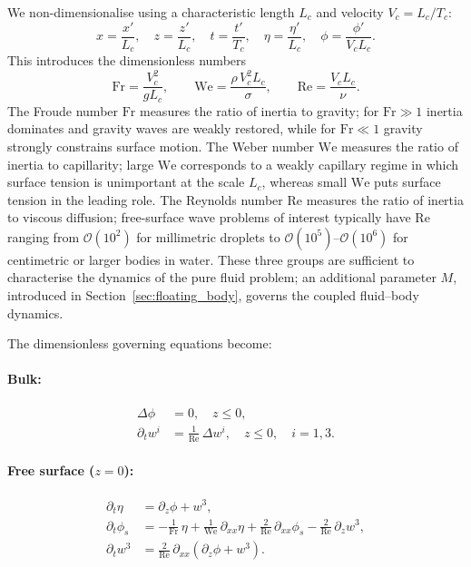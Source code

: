 \documentclass{article}
\newcommand{\Fr}{\mathrm{Fr}}
\newcommand{\We}{\mathrm{We}}
\newcommand{\Rey}{\mathrm{Re}}
\newcommand{\OO}{\mathcal{O}}
\begin{document}
We non-dimensionalise using a characteristic length $L_c$ and velocity $V_c = L_c / T_c$:
\begin{equation}
    x = \frac{x'}{L_c}, \quad z = \frac{z'}{L_c}, \quad t = \frac{t'}{T_c}, \quad \eta = \frac{\eta'}{L_c}, \quad \phi = \frac{\phi'}{V_c L_c}.
    \label{eq:nondim}
\end{equation}
This introduces the dimensionless numbers
\begin{equation}
    \Fr = \frac{V_c^2}{g L_c}, \qquad
    \We = \frac{\rho\, V_c^2 L_c}{\sigma}, \qquad
    \Rey = \frac{V_c L_c}{\nu}.
    \label{eq:dimless}
\end{equation}
The Froude number $\Fr$ measures the ratio of inertia to gravity; for $\Fr \gg 1$ inertia dominates and gravity waves are weakly restored, while for $\Fr \ll 1$ gravity strongly constrains surface motion.
The Weber number $\We$ measures the ratio of inertia to capillarity; large $\We$ corresponds to a weakly capillary regime in which surface tension is unimportant at the scale $L_c$, whereas small $\We$ puts surface tension in the leading role.
The Reynolds number $\Rey$ measures the ratio of inertia to viscous diffusion; free-surface wave problems of interest typically have $\Rey$ ranging from $\OO(10^2)$ for millimetric droplets to $\OO(10^5)$--$\OO(10^6)$ for centimetric or larger bodies in water.
These three groups are sufficient to characterise the dynamics of the pure fluid problem; an additional parameter $M$, introduced in Section~\ref{sec:floating_body}, governs the coupled fluid--body dynamics.

The dimensionless governing equations become:

\paragraph{Bulk:}
\begin{align}
    \Delta\phi &= 0, \quad z \leq 0, \label{eq:nd_laplace} \\
    \partial_t w^i &= \frac{1}{\Rey}\,\Delta w^i, \quad z \leq 0, \quad i = 1,3. \label{eq:nd_heat}
\end{align}

\paragraph{Free surface ($z = 0$):}
\begin{align}
    \partial_t \eta &= \partial_z \phi + w^3, \label{eq:nd_kin} \\
    \partial_t \phi_s &= -\frac{1}{\Fr}\,\eta + \frac{1}{\We}\,\partial_{xx}\eta + \frac{2}{\Rey}\,\partial_{xx} \phi_s - \frac{2}{\Rey}\,\partial_z w^3, \label{eq:nd_dyn} \\
    \partial_t w^3 &= \frac{2}{\Rey}\,\partial_{xx}\!\left(\partial_z\phi + w^3\right). \label{eq:nd_vort}
\end{align}
\end{document}
